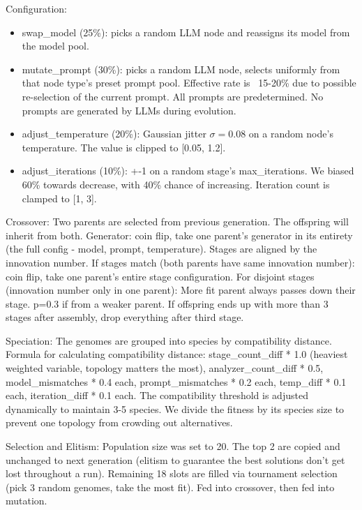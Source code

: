 \documentclass{article}
\begin{document}
Configuration:
\begin{itemize}
    \item swap\_model (25\%): picks a random LLM node and reassigns its model from the model pool.
    \item mutate\_prompt (30\%): picks a random LLM node, selects uniformly from that node type's preset prompt pool. Effective rate is ~15-20\% due to possible re-selection of the current prompt. All prompts are predetermined. No prompts are generated by LLMs during evolution.
    \item adjust\_temperature (20\%): Gaussian jitter $\sigma=0.08$ on a random node's temperature. The value is clipped to [0.05, 1.2].
    \item adjust\_iterations (10\%): +-1 on a random stage's max\_iterations. We biased 60\% towards decrease, with 40\% chance of increasing. Iteration count is clamped to [1, 3].
\end{itemize}

Crossover:
Two parents are selected from previous generation. The offspring will inherit from both. Generator: coin flip, take one parent's generator in its entirety (the full config - model, prompt, temperature). Stages are aligned by the innovation number. If stages match (both parents have same innovation number): coin flip, take one parent's entire stage configuration. For disjoint stages (innovation number only in one parent): More fit parent always passes down their stage. p=0.3 if from a weaker parent. If offspring ends up with more than 3 stages after assembly, drop everything after third stage.

Speciation:
The genomes are grouped into species by compatibility distance. Formula for calculating compatibility distance: stage\_count\_diff * 1.0 (heaviest weighted variable, topology matters the most), analyzer\_count\_diff * 0.5, model\_mismatches * 0.4 each, prompt\_mismatches * 0.2 each, temp\_diff * 0.1 each, iteration\_diff * 0.1 each. The compatibility threshold is adjusted dynamically to maintain 3-5 species. We divide the fitness by its species size to prevent one topology from crowding out alternatives.

Selection and Elitism:
Population size was set to 20. The top 2 are copied and unchanged to next generation (elitism to guarantee the best solutions don't get lost throughout a run). Remaining 18 slots are filled via tournament selection (pick 3 random genomes, take the most fit). Fed into crossover, then fed into mutation. 
\end{document}
